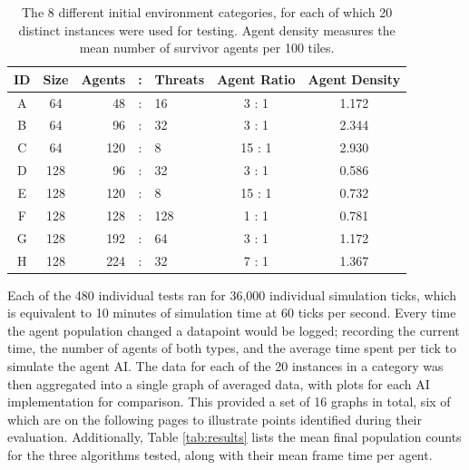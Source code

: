 \documentclass[12pt,a4paper]{article}
\begin{document}
\begin{table}[ht]
\centering
\begin{tabular}{|c|c|rcl|c|c|} \hline
{\bf ID} & {\bf Size} & {\bf Agents} & : & {\bf Threats} & {\bf Agent Ratio} & {\bf Agent Density} \\ \hline
A & 64 & 48 & : & 16 & 3 : 1 & 1.172 \\
B & 64 & 96 & : & 32 & 3 : 1 & 2.344 \\
C & 64 & 120 & : & 8 & 15 : 1 & 2.930 \\ \hline
D & 128 & 96 & : & 32 & 3 : 1 & 0.586 \\
E & 128 & 120 & : & 8 & 15 : 1 & 0.732 \\
F & 128 & 128 & : & 128 & 1 : 1 & 0.781 \\
G & 128 & 192 & : & 64 & 3 : 1 & 1.172 \\
H & 128 & 224 & : & 32 & 7 : 1 & 1.367 \\ \hline
\end{tabular}
\caption{The 8 different initial environment categories, for each of which 20 distinct instances were used for testing. Agent density measures the mean number of survivor agents per 100 tiles.}
\label{tab:environs}
\end{table}

Each of the 480 individual tests ran for 36,000 individual simulation ticks, which is equivalent to 10 minutes of simulation time at 60 ticks per second. Every time the agent population changed a datapoint would be logged; recording the current time, the number of agents of both types, and the average time spent per tick to simulate the agent AI. The data for each of the 20 instances in a category was then aggregated into a single graph of averaged data, with plots for each AI implementation for comparison. This provided a set of 16 graphs in total, six of which are on the following pages to illustrate points identified during their evaluation. Additionally, Table \ref{tab:results} lists the mean final population counts for the three algorithms tested, along with their mean frame time per agent.
\end{document}
